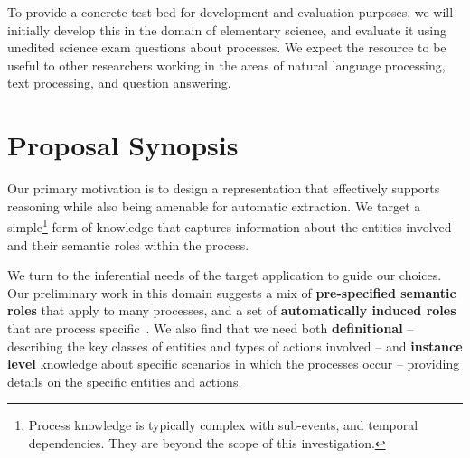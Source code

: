 To provide a concrete test-bed for development and evaluation purposes, we will initially
develop this in the domain of elementary science, and evaluate it using unedited science
exam questions about processes. We expect the resource to be useful to other researchers
working in the areas of natural language processing, text processing, and question answering.

\section{Proposal Synopsis}


Our primary motivation is to design a representation that effectively supports reasoning while also being amenable for automatic extraction.
We target a simple\footnote{Process knowledge is typically complex with sub-events, and temporal dependencies. They are beyond the scope of this investigation.} form of  knowledge that captures information about the entities involved and their semantic roles within the process.

We turn to the inferential needs of the target application to guide our choices.
Our preliminary work in this domain suggests a mix of {\bf pre-specified semantic roles} that apply to many processes, 
and a set of {\bf automatically induced roles} that are process specific~\cite{louvan2015:kcap}. 
We also find that we need both {\bf definitional} -- describing the key classes of entities and types of actions involved -- and {\bf instance level} knowledge about specific scenarios in which the processes occur -- providing details on the specific entities and actions. 


